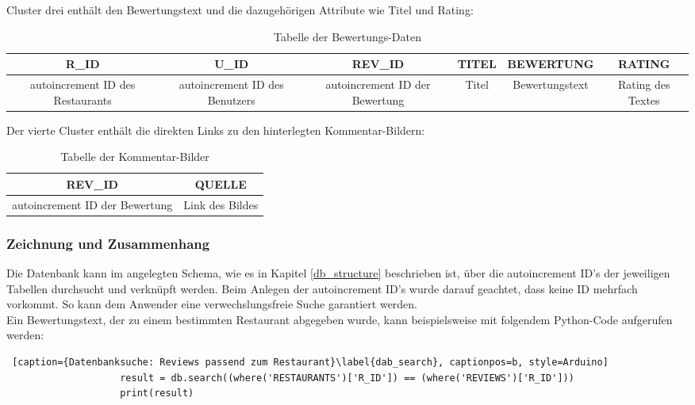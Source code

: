 \documentclass[a4paper,oneside,12pt]{report}
\begin{document}
			 		Cluster drei enthält den Bewertungstext und die dazugehörigen Attribute wie Titel und Rating:
			 		
			 		\begin{table}[H]
			 			\centering
			 			\begin{tabular}{cccccc}
			 				\toprule
			 				\tiny \bf R\_ID & \tiny \bf U\_ID & \tiny \bf REV\_ID & \tiny \bf TITEL & \tiny \bf BEWERTUNG & \tiny \bf RATING\\
			 				\midrule
			 				\tiny autoincrement ID des Restaurants & \tiny autoincrement ID des Benutzers & \tiny autoincrement ID der Bewertung & \tiny Titel & \tiny Bewertungstext & \tiny Rating des Textes\\
			 				\bottomrule
			 			\end{tabular}
			 			\caption[Bewertungs Tabelle]{Tabelle der Bewertungs-Daten}
			 			\label{tab_rev}
			 		\end{table}
				 	
				 	Der vierte Cluster enthält die direkten Links zu den hinterlegten Kommentar-Bildern:
				 	
				 	\begin{table}[H]
				 		\centering
				 		\begin{tabular}{cc}
				 			\toprule
				 			\tiny \bf REV\_ID & \tiny \bf QUELLE\\
				 			\midrule
				 			\tiny autoincrement ID der Bewertung & \tiny Link des Bildes\\
				 			\bottomrule
				 		\end{tabular}
				 		\caption[Bilder Tabelle]{Tabelle der Kommentar-Bilder}
				 		\label{tab_pics}
				 	\end{table}
			 	
			 	
				\subsubsection{Zeichnung und Zusammenhang}
				
					Die Datenbank kann im angelegten Schema, wie es in Kapitel \ref{db_structure} beschrieben ist, über die autoincrement ID's der jeweiligen Tabellen durchsucht und verknüpft werden. Beim Anlegen der autoincrement ID's wurde darauf geachtet, dass keine ID mehrfach vorkommt. So kann dem Anwender eine verwechslungsfreie Suche garantiert werden.\\
					Ein Bewertungstext, der zu einem bestimmten Restaurant abgegeben wurde, kann beispielsweise mit folgendem Python-Code aufgerufen werden:
					\\
					\begin{lstlisting} [caption={Datenbanksuche: Reviews passend zum Restaurant}\label{dab_search}, captionpos=b, style=Arduino]
					result = db.search((where('RESTAURANTS')['R_ID']) == (where('REVIEWS')['R_ID']))
					print(result)
					\end{lstlisting}
					
\end{document}
